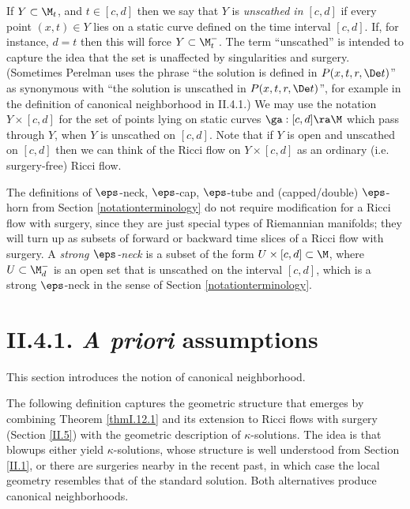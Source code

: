 If $Y\subset \M_t$, and $t\in[c,d]$ then we say that $Y$
is {\em unscathed in $[c,d]$} if every point $(x,t)\in Y$
lies on  a static curve defined on the time
interval $[c,d]$.  If, for instance, $d=t$ then this will force
$Y\subset \M_t^-$.
The term ``unscathed'' is intended to capture the idea that
the set is unaffected by singularities and surgery.
(Sometimes Perelman uses the phrase
``the solution is defined in $P(x,t,r,\De t)$'' as synonymous with
``the solution is unscathed in $P(x,t,r,\De t)$'', for example in
the definition of canonical neighborhood in II.4.1.)
We  may use the
notation  $Y\times [c,d]$ for the set of points lying on static
curves $\ga:[c,d]\ra\M$ which pass through $Y$, when
$Y$ is unscathed on $[c,d]$.
Note that if $Y$ is open and
unscathed on $[c,d]$ then we can think of the Ricci flow on $Y\times [c,d]$
as an ordinary (i.e. surgery-free) Ricci flow.

The definitions of $\eps$-neck, $\eps$-cap, $\eps$-tube and
(capped/double) $\eps$-horn
from Section \ref{notationterminology}
do not require modification for
a Ricci flow with surgery, since they are just special types of Riemannian
manifolds; they will turn up as subsets of forward or backward
time slices of a Ricci flow with surgery. A {\em strong $\eps$-neck}
is a subset  of the form $U\times [c,d]\subset \M$, where $U\subset \M_d^-$
is an open set  that is unscathed on the interval $[c,d]$,
which is a strong $\eps$-neck in the sense of
Section \ref{notationterminology}.


\section{II.4.1. {\it A priori} assumptions}

This section introduces the notion of canonical neighborhood.

The following definition captures the geometric structure that
emerges by combining Theorem \ref{thmI.12.1} and its extension
to Ricci flows with surgery (Section \ref{II.5})
with the geometric description of $\kappa$-solutions.   The idea
is that blowups either yield $\kappa$-solutions, whose
structure is well understood from Section \ref{II.1}, or there are surgeries nearby
in the recent  past, in which case the local geometry resembles
that of the standard solution.   Both alternatives produce canonical
neighborhoods.

